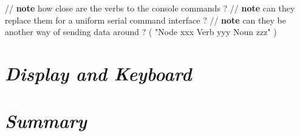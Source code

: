 // \textbf{note} how close are the verbs to the console commands ?
// \textbf{note} can they replace them for a uniform serial command interface ?
// \textbf{note} can they be another way of sending data around ? ( "Node xxx Verb yyy Noun zzz" )


\section{\textit{Display and Keyboard}}


\section{\textit{Summary}}
